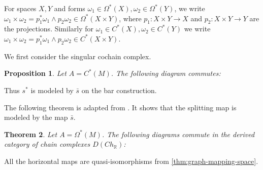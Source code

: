 \documentclass{scrartcl}
\theoremstyle{plain}
\newtheorem{theorem}{Theorem}[section]
\newtheorem{proposition}[theorem]{Proposition}
\theoremstyle{definition}
\newcommand{\R}{\mathbb R}
\DeclareMathOperator{\id}{id}
\DeclareMathOperator{\Map}{Map}
\begin{document}
For spaces $X, Y$ and forms $\omega_1\in\Omega^*(X), \omega_2\in\Omega^*(Y)$, we write $\omega_1\times\omega_2 = p_1^*\omega_1 \wedge p_2\omega_2\in\Omega^*(X\times Y)$, where $p_1\colon X\times Y\to X$ and $p_2\colon X\times Y\to Y$ are the projections. Similarly for $\omega_1\in C^*(X), \omega_2\in C^*(Y)$ we write $\omega_1\times\omega_2 = p_1^*\omega_1 \wedge p_2\omega_2\in C^*(X\times Y)$.

We first consider the singular cochain complex. 
\begin{proposition}\label{prop:splitting-model-singular}
    Let $A=C^*(M)$. The following diagram commutes:
\begin{center}
\end{center}
\end{proposition}
Thus $s^*$ is modeled by $\bar s$ on the bar construction. 


The following theorem is adapted from \cite[Prop. 4.2]{naef2019string}. It shows that the splitting map is modeled by the map $\bar s$. 
\begin{theorem}\label{thm:model-splitting}
    Let $A=\Omega^*(M)$. The following diagrams commute in the derived category of chain complexes $D(Ch_\R)$:

    \qquad
\end{theorem}
All the horizontal maps are quasi-isomorphisms from \cref{thm:graph-mapping-space}.
\end{document}
